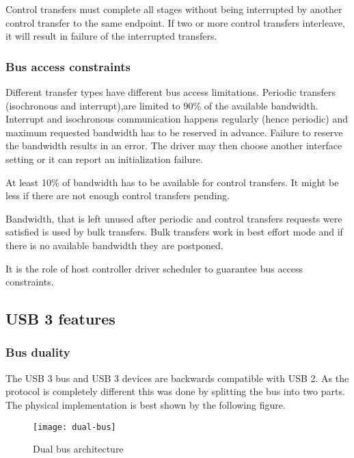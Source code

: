 Control transfers must complete all stages without being interrupted by another
control transfer to the same endpoint. If two or more control transfers
interleave, it will result in failure of the interrupted transfers.

\subsubsection{Bus access constraints}

Different transfer types have different bus access limitations. Periodic
transfers (isochronous and interrupt),are limited to 90\% of the available
bandwidth. Interrupt and isochronous communication happens regularly (hence
periodic) and maximum requested bandwidth has to be reserved in advance.
Failure to reserve the bandwidth results in an error. The driver may then
choose another interface setting or it can report an initialization failure.

At least 10\% of bandwidth has to be available for control transfers. It might
be less if there are not enough control transfers pending.

Bandwidth, that is left unused after periodic and control transfers requests
were satisfied is used by bulk transfers. Bulk transfers work in best effort
mode and if there is no available bandwidth they are postponed.

It is the role of host controller driver scheduler to guarantee bus access
constraints.

\subsection{USB 3 features}

\subsubsection{Bus duality}

The USB 3 bus and USB 3 devices are backwards compatible with USB 2. As the
protocol is completely different this was done by splitting the bus into two
parts. The physical implementation is best shown by the following figure.


\begin{figure}[h]
	\centering
	\texttt{[image: dual-bus]}
	\caption{Dual bus architecture}
	\label{fig:dual-bus}
\end{figure}

